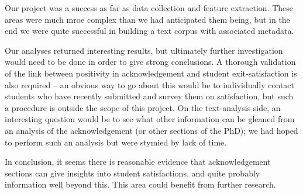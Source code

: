 Our project was a success as far as data collection and feature extraction. These areas were much mroe complex than we had anticipated them being, but in the end we were quite successful in building a text corpus with associated metadata.

Our analyses returned interesting results, but ultimately further investigation would need to be done in order to give strong conclusions. A thorough validation of the link between positivity in acknowledgement and student exit-satisfaction is also required -- an obvious way to go about this would be to individually contact students who have recently submitted and survey them on satisfaction, but such a procedure is outside the scope of this project. On the text-analysis side, an interesting question would be to see what other information can be gleaned from an analysis of the acknowledgement (or other sections of the PhD); we had hoped to perform such an analysis but were stymied by lack of time.

In conclusion, it seems there is reasonable evidence that acknowledgement sections can give insights into student satisfactions, and quite probably information well beyond this. This area could benefit from further research.